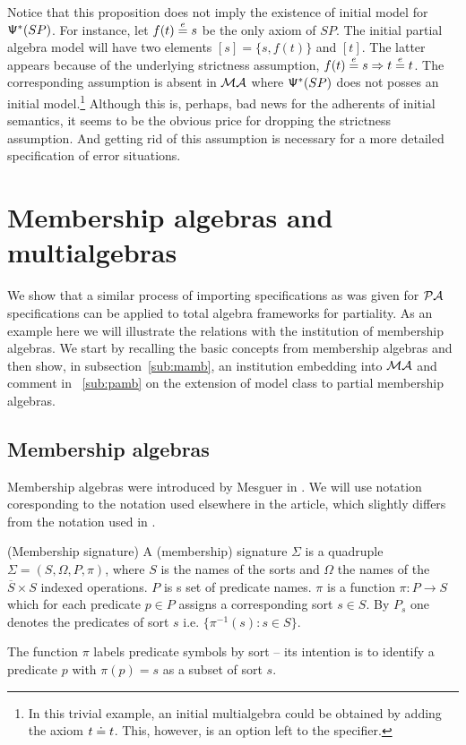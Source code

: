 \documentclass[10pt]{article}
\begin{document}
%
Notice that this proposition does not imply the existence of initial model
for ${\sf {\Psi}}^*(SP)$. For instance, let $f(t)\stackrel{e}{=} s$ be the only axiom of
$SP$. The initial partial algebra model will have two elements
$[s]=\{s,f(t)\}$ and $[t]$. The latter appears because of the underlying
strictness assumption, $f(t)\stackrel{e}{=} s\Rightarrow t\stackrel{e}{=} t$. The corresponding assumption
is absent in ${\mathcal{MA}}$ where ${\sf {\Psi}}^*(SP)$ does not posses an initial
model.\footnote{In this trivial example, an initial multialgebra could be
obtained by adding the axiom $t\mathrel{\dot{=} } t$. This, however, is an option left to
the specifier.} Although this is, perhaps, bad news for the adherents of
initial semantics, it seems to be the obvious price for dropping the
strictness assumption. And getting rid of this assumption is necessary for a
more detailed specification of error situations.

\section{Membership algebras and multialgebras}\label{se:member}
We show that a similar process of importing specifications as was given for
${\mathcal{PA}}$ specifications can be applied to total algebra frameworks for
partiality. As an example here we will illustrate the relations with the
institution of membership algebras.
We start by recalling the basic concepts from membership algebras and then show,
in subsection~\ref{sub:mamb}, an institution embedding into ${\mathcal{MA}}$ and
comment in ~\ref{sub:pamb} on the extension of model class to partial membership algebras. 
%
\subsection{Membership algebras}
Membership algebras were introduced by Mesguer in \cite{member}. We will use
notation coresponding to the notation used elsewhere in the article, which slightly differs
from the notation used in \cite{member}.

\begin{definition} (Membership signature)
A (membership) signature $\Sigma$ is a quadruple $\Sigma=(S,\Omega,P,\pi)$, where $S$ is
the names of the sorts and $\Omega$ the names of the $\overline{S} \times
S$ indexed operations. $P$ is s set of predicate names. $\pi$ is a function
$\pi:P \to S$ which for each predicate $p \in P$ assigns a corresponding sort
$s \in S$. By $P_s$ one denotes the predicates of sort $s$
i.e. $\{\pi^{-1}(s): s\in S\}$.
\end{definition}
%
The function $\pi$ labels predicate symbols by sort -- its intention is to
identify a predicate $p$ with $\pi(p)=s$ as a subset of sort $s$.
\end{document}
